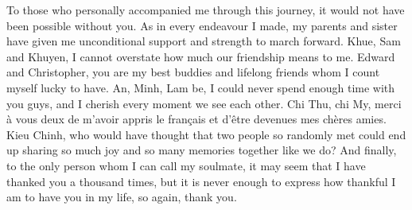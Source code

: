 \begin{acknowledgments}
To those who personally accompanied me through this journey, it would not have been possible without you.
As in every endeavour I made, my parents and sister have given me unconditional support and strength to march forward. 
Khue, Sam and Khuyen, I cannot overstate how much our friendship means to me. 
Edward and Christopher, you are my best buddies and lifelong friends whom I count myself lucky to have. 
An, Minh, Lam be, I could never spend enough time with you guys, and I cherish every moment we see each other.
Chi Thu, chi My, merci à vous deux de m'avoir appris le français et d'être devenues mes chères amies. 
Kieu Chinh, who would have thought that two people so randomly met could end up sharing so much joy and so many memories together like we do? 
And finally, to the only person whom I can call my soulmate, it may seem that I have thanked you a thousand times, but it is never enough to express how thankful I am to have you in my life, so again, thank you.



\end{acknowledgments}


\tableofcontents
\listoftables
\listoffigures

%   

%   


\clearpage{} %